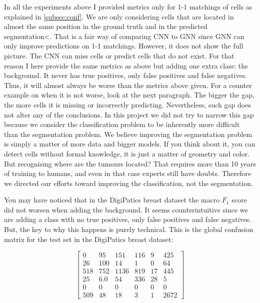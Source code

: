 In all the experiments above I provided metrics only for 1-1 matchings of cells as explained in \autoref{subsec:conf}. We are only considering cells that are located in almost the same position in the ground truth and in the predicted segmentation<. That is a fair way of comparing CNN to GNN since GNN can only improve predictions on 1-1 matchings. However, it does not show the full picture. The CNN can miss cells or predict cells that do not exist. For that reason I here provide the same metrics as above but adding one extra class: the background. It never has true positives, only false positives and false negatives. Thus, it will almost always be worse than the metrics above given. For a counter example on when it is not worse, look at the next paragraph. The bigger the gap, the more cells it is missing or incorrectly predicting. Nevertheless, such gap does not alter any of the conclusions. In this project we did not try to narrow this gap because we consider the classification problem to be inherently more difficult than the segmentation problem. We believe improving the segmentation problem is simply a matter of more data and bigger models. If you think about it, you can detect cells without formal knowledge, it is just a matter of geometry and color. But recognising where are the tumours located? That requires more than 10 years of training to humans, and even in that case experts still have doubts. Therefore we directed our efforts toward improving the classification, not the segmentation.

You may have noticed that in the DigiPatics breast dataset the macro $F_1$ score did not worsen when adding the background. It seems counterintuitive since we are adding a class with no true positives, only false positives and false negatives. But, the key to why this happens is purely technical. This is the global confusion matrix for the test set in the DigiPatics breast dataset:

\[
\begin{bmatrix}
0 & 95 & 151 & 116 & 9 & 425 \\
26 & 100 & 14 & 1 & 0 & 64 \\
518 & 752 & 1136 & 819 & 17 & 445 \\
25 & 6.0 & 54 & 336 & 28 & 5 \\
0 & 0 & 0 & 0 & 0 & 0 \\
509 & 48 & 18 & 3 & 1 & 2672
\end{bmatrix}
\]

